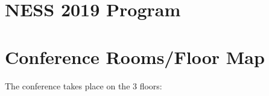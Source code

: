 \documentclass[10pt]{article}
\begin{document}





\section*{\centering NESS 2019 Program}
{\centering \small \tableofcontents}

\clearpage

\section*{Conference Rooms/Floor Map}

The conference takes place on the 3 floors:
\end{document}
